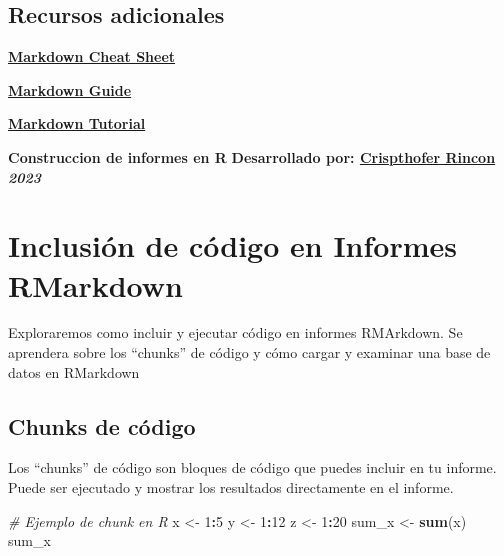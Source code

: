 \documentclass[
]{book}
\newenvironment{Shaded}{\begin{snugshade}}{\end{snugshade}}
\newcommand{\CommentTok}[1]{\textcolor[rgb]{0.56,0.35,0.01}{\textit{#1}}}
\newcommand{\DecValTok}[1]{\textcolor[rgb]{0.00,0.00,0.81}{#1}}
\newcommand{\FunctionTok}[1]{\textcolor[rgb]{0.13,0.29,0.53}{\textbf{#1}}}
\newcommand{\NormalTok}[1]{#1}
\newcommand{\OtherTok}[1]{\textcolor[rgb]{0.56,0.35,0.01}{#1}}
\newcommand{\SpecialCharTok}[1]{\textcolor[rgb]{0.81,0.36,0.00}{\textbf{#1}}}
\theoremstyle{definition}
\theoremstyle{definition}
\theoremstyle{definition}
\theoremstyle{definition}
\theoremstyle{remark}
\begin{document}
\hypertarget{recursos-adicionales}{%
\section*{Recursos adicionales}\label{recursos-adicionales}}

\href{https://github.com/adam-p/markdown-here/wiki/Markdown-Cheatsheet}{\textbf{Markdown Cheat Sheet}}

\href{https://guides.github.com/features/mastering-markdown/}{\textbf{Markdown Guide}}

\href{https://www.markdowntutorial.com}{\textbf{Markdown Tutorial}}

\textbf{Construccion de informes en R}
\textbf{Desarrollado por: \href{https://linkedin.com/in/carmurrain}{Crispthofer Rincon}}
\emph{\textbf{2023}}

\hypertarget{inclusiuxf3n-de-cuxf3digo-en-informes-rmarkdown}{%
\chapter*{Inclusión de código en Informes RMarkdown}\label{inclusiuxf3n-de-cuxf3digo-en-informes-rmarkdown}}

Exploraremos como incluir y ejecutar código en informes RMArkdown. Se aprendera sobre los ``chunks'' de código y cómo cargar y examinar una base de datos en RMarkdown

\hypertarget{chunks-de-cuxf3digo}{%
\section*{Chunks de código}\label{chunks-de-cuxf3digo}}

Los ``chunks'' de código son bloques de código que puedes incluir en tu informe. Puede ser ejecutado y mostrar los resultados directamente en el informe.

\begin{Shaded}
\begin{Highlighting}[]
\CommentTok{\# Ejemplo de chunk en R}
\NormalTok{x }\OtherTok{\textless{}{-}} \DecValTok{1}\SpecialCharTok{:}\DecValTok{5}
\NormalTok{y }\OtherTok{\textless{}{-}} \DecValTok{1}\SpecialCharTok{:}\DecValTok{12}
\NormalTok{z }\OtherTok{\textless{}{-}} \DecValTok{1}\SpecialCharTok{:}\DecValTok{20}
\NormalTok{sum\_x }\OtherTok{\textless{}{-}} \FunctionTok{sum}\NormalTok{(x)}
\NormalTok{sum\_x}
\end{Highlighting}
\end{Shaded}
\end{document}

